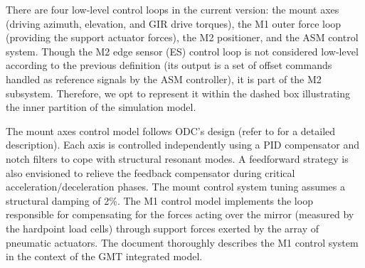 \documentclass{gmto}
\begin{document}
There are four low-level control loops in the current version: the mount axes (driving azimuth, elevation, and GIR drive torques), the M1 outer force loop (providing the support actuator forces), the M2 positioner, and the ASM control system. %
%
Though the M2 edge sensor (ES) control loop is not considered low-level according to the previous definition (its output is a set of offset commands handled as reference signals by the ASM controller), it is part of the M2 subsystem. Therefore, we opt to represent it within the dashed box illustrating the inner partition of the simulation model.

The mount axes control model follows ODC's design (refer to \cite{ODC_end2end_2021} for a detailed description). Each axis is controlled independently using a PID compensator and notch filters to cope with structural resonant modes. A feedforward strategy is also envisioned to relieve the feedback compensator during critical acceleration/deceleration phases. The mount control system tuning assumes a structural damping of 2\%. %
%
The M1 control model implements the loop responsible for compensating for the forces acting over the mirror (measured by the hardpoint load cells) through support forces exerted by the array of pneumatic actuators. %
The document \cite{GMT.DOC.05153} thoroughly describes the M1 control system in the context of the GMT integrated model. %

\end{document}
